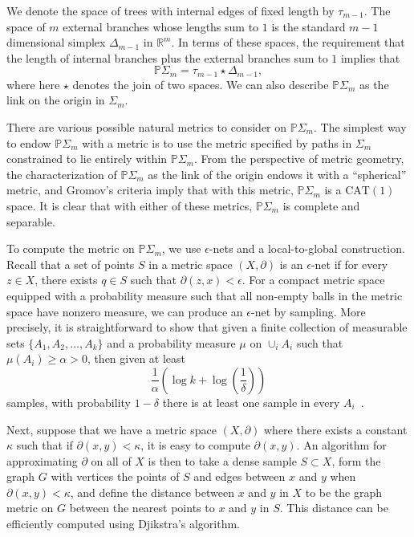 \documentclass[a4paper,11pt]{article}
\newcommand{\CAT}{\textrm{CAT}}
\begin{document}
We denote the space of trees with internal edges of fixed length by $\tau_{m-1}$.
The space of $m$ external branches whose lengths sum to $1$ is the standard $m-1$ dimensional simplex $\Delta_{m-1}$ in $\mathbb{R}^m$.
In terms of these spaces, the requirement that the length of internal branches plus the external branches sum to $1$ implies that \[\mathbb{P}\Sigma_m = \tau_{m-1} \star \Delta_{m-1},\] where here $\star$ denotes the join of two spaces.
We can also describe $\mathbb{P}\Sigma_m$ as the link on the origin in $\Sigma_m$.

There are various possible natural metrics to consider on $\mathbb{P} \Sigma_m$.
The simplest way to endow $\mathbb{P} \Sigma_m$ with a metric is to use the metric specified by paths in $\Sigma_m$ constrained to lie entirely within $\mathbb{P} \Sigma_m$.
From the perspective of metric geometry, the characterization of $\mathbb{P} \Sigma_m$ as the link of the origin endows it with a ``spherical'' metric, and Gromov's criteria imply that with this metric, $\mathbb{P} \Sigma_m$ is a $\CAT(1)$ space.
It is clear that with either of these metrics, $\mathbb{P} \Sigma_m$ is complete and separable.

To compute the metric on $\mathbb{P}\Sigma_m$, we use $\epsilon$-nets and a local-to-global construction.
Recall that a set of points $S$ in a metric space $(X,\partial)$ is an $\epsilon$-net if for every $z \in X$, there exists $q \in S$ such that $\partial(z,x) < \epsilon$.
For a compact metric space equipped with a probability measure such that all non-empty balls in the metric space have nonzero measure, we can produce an $\epsilon$-net by sampling.
More precisely, it is straightforward to show that given a finite collection of measurable sets $\{A_1, A_2, \ldots, A_k\}$ and a probability measure $\mu$ on $\cup_i A_i$ such that $\mu(A_i) \geq \alpha > 0$, then given at least
\[
\frac{1}{\alpha}\left(\log k + \log(\frac{1}{\delta})\right)
\]
samples, with probability $1-\delta$ there is at least one sample in every $A_i$~\cite[5.1]{niyogi2008finding}.

Next, suppose that we have a metric space $(X,\partial)$ where there exists a constant $\kappa$ such that if $\partial(x,y) < \kappa$, it is easy to compute $\partial(x,y)$.
An algorithm for approximating $\partial$ on all of $X$ is then to take a dense sample $S \subset X$, form the graph $G$ with vertices the points of $S$ and edges between $x$ and $y$ when $\partial(x,y) < \kappa$, and define the distance between $x$ and $y$ in $X$ to be the graph metric on $G$ between the nearest points to $x$ and $y$ in $S$.
This distance can be efficiently computed using Djikstra's algorithm.
\end{document}
